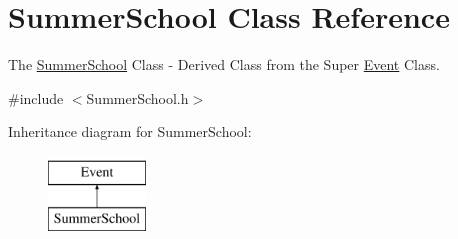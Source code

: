 \hypertarget{classSummerSchool}{}\section{Summer\+School Class Reference}
\label{classSummerSchool}


The \hyperlink{classSummerSchool}{Summer\+School} Class -\/ Derived Class from the Super \hyperlink{classEvent}{Event} Class.  




{\ttfamily \#include $<$Summer\+School.\+h$>$}

Inheritance diagram for Summer\+School\+:\begin{figure}[H]
\begin{center}
\leavevmode
\includegraphics[height=2.000000cm]{classSummerSchool}
\end{center}
\end{figure}

